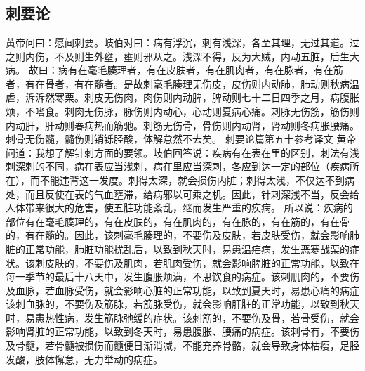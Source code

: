 \documentclass[a4paper,12pt,UTF8,twoside]{ctexbook}
\begin{document}
\part{}
\chapter{刺要论}
黄帝问曰：愿闻刺要。岐伯对曰：病有浮沉，刺有浅深，各至其理，无过其道。过之则内伤，不及则生外壅，壅则邪从之。浅深不得，反为大贼，内动五脏，后生大病。
故曰：病有在毫毛腠理者，有在皮肤者，有在肌肉者，有在脉者，有在筋者，有在骨者，有在髓者。是故刺毫毛腠理无伤皮，皮伤则内动肺，肺动则秋病温虐，泝泝然寒栗。刺皮无伤肉，肉伤则内动脾，脾动则七十二日四季之月，病腹胀烦，不嗜食。刺肉无伤脉，脉伤则内动心，心动则夏病心痛。刺脉无伤筋，筋伤则内动肝，肝动则春病热而筋驰。刺筋无伤骨，骨伤则内动肾，肾动则冬病胀腰痛。刺骨无伤髓，髓伤则销铄胫酸，体解怠然不去矣。
刺要论篇第五十参考译文
黄帝问道：我想了解针刺方面的要领。岐伯回答说：疾病有在表在里的区别，刺法有浅刺深刺的不同，病在表应当浅刺，病在里应当深刺，各应到达一定的部位（疾病所在），而不能违背这一发度。刺得太深，就会损伤内脏；刺得太浅，不仅达不到病处，而且反使在表的气血壅滞，给病邪以可乘之机。因此，针刺深浅不当，反会给人体带来很大的危害，使五脏功能紊乱，继而发生严重的疾病。
所以说：疾病的部位有在毫毛腠理的，有在皮肤的，有在肌肉的，有在脉的，有在筋的，有在骨的，有在髓的。因此，该刺毫毛腠理的，不要伤及皮肤，若皮肤受伤，就会影响肺脏的正常功能，肺脏功能扰乱后，以致到秋天时，易患温疟病，发生恶寒战栗的症状。该刺皮肤的，不要伤及肌肉，若肌肉受伤，就会影响脾脏的正常功能，以致在每一季节的最后十八天中，发生腹胀烦满，不思饮食的病症。该刺肌肉的，不要伤及血脉，若血脉受伤，就会影响心脏的正常功能，以致到夏天时，易患心痛的病症该刺血脉的，不要伤及筋脉，若筋脉受伤，就会影响肝脏的正常功能，以致到秋天时，易患热性病，发生筋脉弛缓的症状。该刺筋的，不要伤及骨，若骨受伤，就会影响肾脏的正常功能，以致到冬天时，易患腹胀、腰痛的病症。该刺骨有，不要伤及骨髓，若骨髓被损伤而髓便日渐消减，不能充养骨骼，就会导致身体枯瘦，足胫发酸，肢体懈怠，无力举动的病症。
\end{document}

